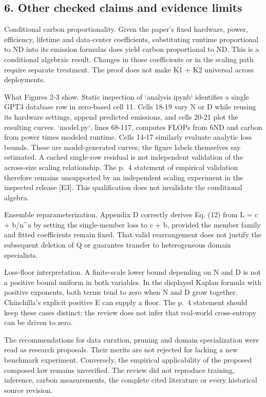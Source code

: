 \documentclass[10pt]{article}
\begin{document}
\subsection*{6. Other checked claims and evidence limits}
Conditional carbon proportionality. Given the paper’s fixed hardware, power, efficiency, lifetime and data-center coefficients, substituting runtime proportional to ND into its emission formulas does yield carbon proportional to ND. This is a conditional algebraic result. Changes in those coefficients or in the scaling path require separate treatment. The proof does not make K1 + K2 universal across deployments.\par
What Figures 2-3 show. Static inspection of `analysis.ipynb` identifies a single GPT3 database row in zero-based cell 11. Cells 18-19 vary N or D while reusing its hardware settings, append predicted emissions, and cells 20-21 plot the resulting curves. `model.py`, lines 68-117, computes FLOPs from 6ND and carbon from power times modeled runtime. Cells 14-17 similarly evaluate analytic loss bounds. These are model-generated curves; the figure labels themselves say estimated. A cached single-row residual is not independent validation of the across-size scaling relationship. The p. 4 statement of empirical validation therefore remains unsupported by an independent scaling experiment in the inspected release [E3]. This qualification does not invalidate the conditional algebra.\par
Ensemble reparameterization. Appendix D correctly derives Eq. (12) from L = c + b/n\textasciicircum{}a by setting the single-member loss to c + b, provided the member family and fitted coefficients remain fixed. That valid rearrangement does not justify the subsequent deletion of Q or guarantee transfer to heterogeneous domain specialists.\par
Loss-floor interpretation. A finite-scale lower bound depending on N and D is not a positive bound uniform in both variables. In the displayed Kaplan formula with positive exponents, both terms tend to zero when N and D grow together. Chinchilla’s explicit positive E can supply a floor. The p. 4 statement should keep these cases distinct; the review does not infer that real-world cross-entropy can be driven to zero.\par
The recommendations for data curation, pruning and domain specialization were read as research proposals. Their merits are not rejected for lacking a new benchmark experiment. Conversely, the empirical applicability of the proposed composed law remains unverified. The review did not reproduce training, inference, carbon measurements, the complete cited literature or every historical source revision.\par
\end{document}
